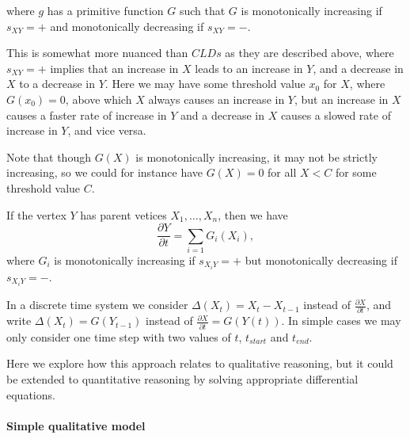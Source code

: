\documentclass[]{article}
\begin{document}
where $g$ has a primitive function $G$ such that $G$ is monotonically
increasing if $s_{XY}=+$ and monotonically decreasing if $s_{XY}= -$.

This is somewhat more nuanced than $CLDs$ as they are described above,
where $s_{XY}=+$ implies that an increase in $X$ leads to an increase
in $Y$, and a decrease in $X$ to a decrease in $Y$.
%
Here we may have some threshold value $x_0$ for $X$, where $G(x_0) = 0$,
above which $X$ always causes an increase in $Y$, but an increase in $X$
causes a faster rate of increase in $Y$ and a decrease in $X$ causes a
slowed rate of increase in $Y$, and vice versa.

Note that though $G(X)$ is monotonically increasing, it may not be strictly
increasing, so we could for instance have $G(X) = 0$ for all $X < C$
for some threshold value $C$.

If the vertex $Y$ has parent vetices $X_1,\ldots,X_n$, then we have
\[\frac{\partial Y}{\partial t} = \sum_{i=1}G_i(X_i),\]
where $G_i$ is monotonically increasing if $s_{X_iY}=+$ but monotonically
decreasing if $s_{X_iY}=-$.

In a discrete time system we consider $\Delta(X_t) = X_t - X_{t-1}$
instead of $\frac{\partial X}{\partial t}$, and write
$\Delta(X_t) = G(Y_{t-1})$ instead of
$\frac{\partial X}{\partial t} = G(Y(t))$.
%
In simple cases we may only consider one time step with two values of
$t$, $t_{start}$ and $t_{end}$.

Here we explore how this approach relates to qualitative reasoning,
but it could be extended to quantitative reasoning by solving
appropriate differential equations.

\paragraph{Simple qualitative model}
\end{document}
